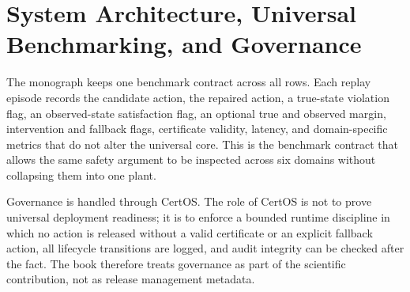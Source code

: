 \chapter{System Architecture, Universal Benchmarking, and Governance}
\label{ch:system-benchmark-governance}

The monograph keeps one benchmark contract across all rows.  Each replay episode
records the candidate action, the repaired action, a true-state violation flag, an
observed-state satisfaction flag, an optional true and observed margin, intervention and
fallback flags, certificate validity, latency, and domain-specific metrics that do not
alter the universal core.  This is the benchmark contract that allows the same safety
argument to be inspected across six domains without collapsing them into one plant.

Governance is handled through CertOS.  The role of CertOS is not to prove universal
deployment readiness; it is to enforce a bounded runtime discipline in which no action
is released without a valid certificate or an explicit fallback action, all lifecycle
transitions are logged, and audit integrity can be checked after the fact.  The book
therefore treats governance as part of the scientific contribution, not as release
management metadata.

